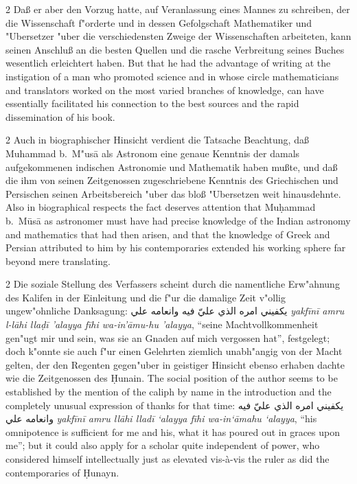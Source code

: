 \documentclass[10pt,a4paper]{article}
\renewcommand{\switchcolumn}{\syncronize\nointerlineskip\columnbreak}
\newcommand{\RL}[1]{\beginR#1\endR}
\newcommand{\ar}[1]{{\arabicfont\RL{#1}}}
\newcommand{\enquote}[1]{``#1''}
\begin{document}
\begin{paracol}{2}
Da\ss{} er aber den Vorzug hatte, auf Veranlassung eines Mannes zu schreiben, der die Wissenschaft f"orderte und in dessen Gefolgschaft Mathematiker und "Ubersetzer "uber die verschiedensten Zweige der Wissenschaften arbeiteten, kann seinen Anschlu\ss{} an die besten Quellen und die rasche Verbreitung seines Buches wesentlich erleichtert haben.
\switchcolumn
But that he had the advantage of writing at the instigation of a man who promoted science and in whose circle mathematicians and translators worked on the most varied branches of knowledge, can have essentially facilitated his connection to the best sources and the rapid dissemination of his book.
\end{paracol}

\begin{paracol}{2}
Auch in biographischer Hinsicht verdient die Tatsache Beachtung, da\ss{} Muhammad b.\ M"us\=a als Astronom eine genaue Kenntnis der damals aufgekommenen indischen Astronomie und Mathematik haben mu\ss{}te, und da\ss{} die ihm von seinen Zeitgenossen zugeschriebene Kenntnis des Griechischen und Persischen seinen Arbeitsbereich "uber das blo\ss{} "Ubersetzen weit hinausdehnte.
\switchcolumn
Also in biographical respects the fact deserves attention that Mu\d{h}ammad b.\ M\=us\=a as astronomer must have had precise knowledge of the Indian astronomy and mathematics that had then arisen, and that the knowledge of Greek and Persian attributed to him by his contemporaries extended his working sphere far beyond mere translating.
\end{paracol}

\begin{paracol}{2}
Die soziale Stellung des Verfassers scheint durch die namentliche Erw"ahnung des Kalifen in der Einleitung und die f"ur die damalige Zeit v"ollig ungew"ohnliche Danksagung: \ar{يكفيني امره الذي عليّ فيه وانعامه علي} \textit{yakf\={i}n\={i} amru l-l\={a}hi lla\d{d}\={i} 'alayya f\={i}hi wa-in'\=amu-hu 'alayya}, \enquote{seine Machtvollkommenheit gen"ugt mir und sein, was sie an Gnaden auf mich vergossen hat}, festgelegt; doch k"onnte sie auch f"ur einen Gelehrten ziemlich unabh"angig von der Macht gelten, der den Regenten gegen"uber in geistiger Hinsicht ebenso erhaben dachte wie die Zeitgenossen des \d{H}unain.
\switchcolumn
The social position of the author seems to be established by the mention of the caliph by name in the introduction and the completely unusual expression of thanks for that time: \ar{يكفيني امره الذي عليّ فيه وانعامه علي} \textit{yakf\={i}n\={i} amru ll\=ahi llad\={i} `alayya f\={i}hi wa-in`\=amahu `alayya}, ``his omnipotence is sufficient for me and his, what it has poured out in graces upon me''; but it could also apply for a scholar quite independent of power, who considered himself intellectually just as elevated vis-\`a-vis the ruler as did the contemporaries of \d{H}unayn.
\end{paracol}
\end{document}
